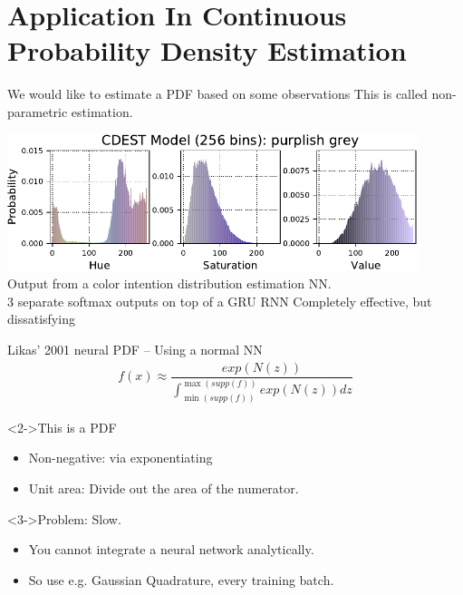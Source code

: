 \documentclass[dvipsnames,handout]{beamer}
\begin{document}
\section{Application In Continuous Probability Density Estimation}

\begin{frame}{We would like to estimate a PDF based on some observations}
	\centering		
	This is called non-parametric estimation.
	
	\vfill
	\includegraphics[width=0.9\textwidth]{gru256purplishgrey}\\
	Output from a color intention distribution estimation NN.\\
	3 separate softmax outputs on top of a GRU RNN
	\vfill
	Completely effective, but dissatisfying
	\vfill
\end{frame}

\begin{frame}{Likas' 2001 neural PDF -- Using a normal NN}
	\begin{align*}
		f(x) \approx \dfrac{exp(N(z))}{\int_{\min(supp(f))}^{\max(supp(f))} exp(N(z)) dz}
	\end{align*}
	
	\begin{block}<2->{This is a PDF}
		\begin{itemize}
			\item Non-negative: via exponentiating
			\item Unit area: Divide out the area of the numerator.
		\end{itemize}
	\end{block}

	
	\begin{block}<3->{Problem: Slow.}
		\begin{itemize}
			\item You cannot integrate a neural network analytically.
			\item So use e.g. Gaussian Quadrature, every training batch.
		\end{itemize}
	\end{block}
	\vfill
\end{frame}
\end{document}
